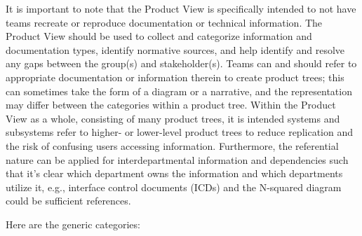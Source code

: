 It is important to note that the Product View is specifically intended to not have teams recreate or reproduce documentation or technical information.
The Product View should be used to collect and categorize information and documentation types, identify normative sources, and help identify and resolve any gaps between the group(s) and stakeholder(s).
Teams can and should refer to appropriate documentation or information therein to create product trees; this can sometimes take the form of a diagram or a narrative, and the representation may differ between the categories within a product tree.
Within the Product View as a whole, consisting of many product trees, it is intended systems and subsystems refer to higher- or lower-level product trees to reduce replication and the risk of confusing users accessing information.
Furthermore, the referential nature can be applied for interdepartmental information and dependencies such that it's clear which department owns the information and which departments utilize it, e.g., interface control documents (ICDs) and the N-squared diagram could be sufficient references.

Here are the generic categories:

